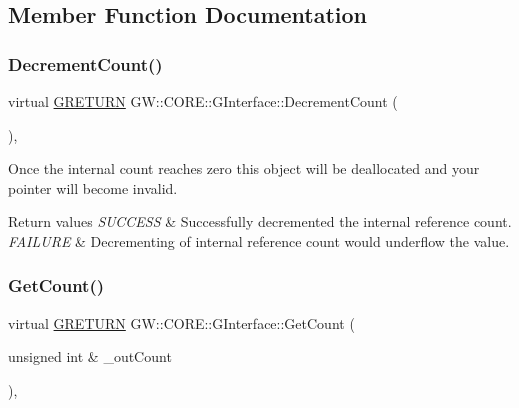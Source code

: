 \subsection{Member Function Documentation}
\hypertarget{class_g_w_1_1_c_o_r_e_1_1_g_interface_af6924e12b14f217b518fc91c63d9703d}{}\label{class_g_w_1_1_c_o_r_e_1_1_g_interface_af6924e12b14f217b518fc91c63d9703d} 
\subsubsection{\texorpdfstring{Decrement\+Count()}{DecrementCount()}}
{\footnotesize\ttfamily virtual \hyperlink{namespace_g_w_a69b1aaebac1cac8049825f035884c95b}{G\+R\+E\+T\+U\+RN} G\+W\+::\+C\+O\+R\+E\+::\+G\+Interface\+::\+Decrement\+Count (\begin{DoxyParamCaption}{ }\end{DoxyParamCaption})\hspace{0.3cm}{\ttfamily [pure virtual]}, {\ttfamily [inherited]}}

Once the internal count reaches zero this object will be deallocated and your pointer will become invalid.


\begin{DoxyRetVals}{Return values}
{\em S\+U\+C\+C\+E\+SS} & Successfully decremented the internal reference count. \\
\hline
{\em F\+A\+I\+L\+U\+RE} & Decrementing of internal reference count would underflow the value. \\
\hline
\end{DoxyRetVals}
\hypertarget{class_g_w_1_1_c_o_r_e_1_1_g_interface_a80f212dcdf60202cf9da49405863d1d5}{}\label{class_g_w_1_1_c_o_r_e_1_1_g_interface_a80f212dcdf60202cf9da49405863d1d5} 
\subsubsection{\texorpdfstring{Get\+Count()}{GetCount()}}
{\footnotesize\ttfamily virtual \hyperlink{namespace_g_w_a69b1aaebac1cac8049825f035884c95b}{G\+R\+E\+T\+U\+RN} G\+W\+::\+C\+O\+R\+E\+::\+G\+Interface\+::\+Get\+Count (\begin{DoxyParamCaption}\item[{unsigned int \&}]{\+\_\+out\+Count }\end{DoxyParamCaption})\hspace{0.3cm}{\ttfamily [pure virtual]}, {\ttfamily [inherited]}}


